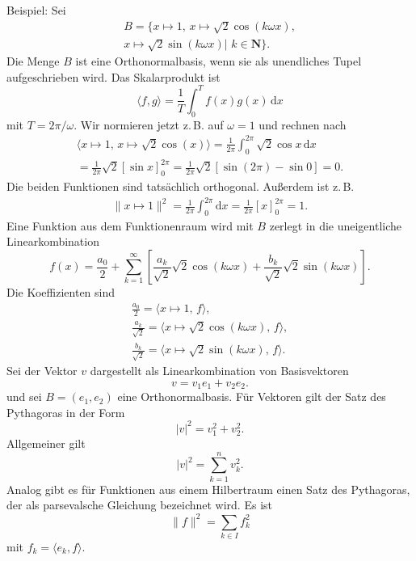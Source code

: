 \documentclass[a4paper,10pt,fleqn,twocolumn,twoside]{article}
\numberwithin{equation}{section}
\begin{document}
Beispiel: Sei
\begin{gather*}
B=\{x\mapsto 1,\,x\mapsto\sqrt{2}\cos(k\omega x),\\
x\mapsto\sqrt{2}\sin(k\omega x)|\,\,k\in\mathbf N\}.
\end{gather*}
Die Menge $B$ ist eine Orthonormalbasis, wenn sie als unendliches
Tupel aufgeschrieben wird. Das Skalarprodukt ist
\begin{equation}
\langle f,g\rangle = \frac{1}{T}\int_0^T f(x)g(x)\,\mathrm dx
\end{equation}
mit $T=2\pi/\omega$. Wir normieren jetzt z.\,B. auf $\omega=1$ und
rechnen nach
\begin{gather*}
\langle x\mapsto 1,\,x\mapsto\sqrt{2}\cos(x)\rangle
= \frac{1}{2\pi}\int_0^{2\pi} \sqrt{2}\cos x\,\mathrm dx\\
= \frac{1}{2\pi}\sqrt{2}[\sin x]_0^{2\pi}
= \frac{1}{2\pi}\sqrt{2}[\sin(2\pi)-\sin 0] = 0.
\end{gather*}
Die beiden Funktionen sind tatsächlich orthogonal. Außerdem ist z.\,B.
\begin{gather*}
\|x\mapsto 1\|^2= \frac{1}{2\pi}\int_0^{2\pi} \mathrm dx
= \frac{1}{2\pi}[x]_0^{2\pi}=1.
\end{gather*}
Eine Funktion aus dem Funktionenraum wird mit $B$ zerlegt in die
uneigentliche Linearkombination
\[f(x) = \frac{a_0}{2}+\sum_{k=1}^\infty
[\frac{a_k}{\sqrt{2}}\sqrt{2}\cos(k\omega x)
+\frac{b_k}{\sqrt{2}}\sqrt{2}\sin(k\omega x)].\]
Die Koeffizienten sind
\begin{gather}
\frac{a_0}{2}
= \langle x\mapsto 1,\,f\rangle,\\
\frac{a_k}{\sqrt{2}}
= \langle x\mapsto \sqrt{2}\cos(k\omega x),\,f\rangle,\\
\frac{b_k}{\sqrt{2}}
= \langle x\mapsto \sqrt{2}\sin(k\omega x),\,f\rangle.
\end{gather}
%
Sei der Vektor $v$ dargestellt als Linearkombination von
Basisvektoren
\begin{equation}
v = v_1e_1+v_2e_2.
\end{equation}
und sei $B=(e_1,e_2)$ eine Orthonormalbasis.
Für Vektoren gilt der Satz des Pythagoras in der Form
\begin{equation}
|v|^2 = v_1^2+v_2^2.
\end{equation}
Allgemeiner gilt
\begin{equation}
|v|^2 = \sum_{k=1}^n v_k^2.
\end{equation}
Analog gibt es für Funktionen aus einem Hilbertraum einen Satz des
Pythagoras, der als
parsevalsche Gleichung bezeichnet wird. Es ist
\begin{equation}
\|f\|^2 = \sum_{k\in I} f_k^2
\end{equation}
mit $f_k=\langle e_k,f\rangle$.
\end{document}
